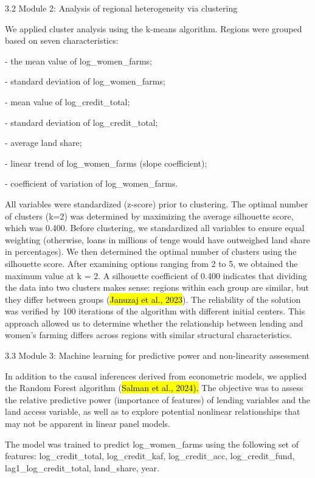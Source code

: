 3.2 Module 2: Analysis of regional heterogeneity via clustering

We applied cluster analysis using the k-means algorithm. Regions were
grouped based on seven characteristics:

- the mean value of log\_women\_farms;

- standard deviation of log\_women\_farms;

- mean value of log\_credit\_total;

- standard deviation of log\_credit\_total;

- average land share;

- linear trend of log\_women\_farms (slope coefficient);

- coefficient of variation of log\_women\_farms.

All variables were standardized (z-score) prior to clustering. The
optimal number of clusters (k=2) was determined by maximizing the
average silhouette score, which was 0.400. Before clustering, we
standardized all variables to ensure equal weighting (otherwise, loans
in millions of tenge would have outweighed land share in percentages).
We then determined the optimal number of clusters using the silhouette
score. After examining options ranging from 2 to 5, we obtained the
maximum value at k = 2. A silhouette coefficient of 0.400 indicates that
dividing the data into two clusters makes sense: regions within each
group are similar, but they differ between groups (\hl{Januzaj et al.,
2023}). The reliability of the solution was verified by 100 iterations
of the algorithm with different initial centers. This approach allowed
us to determine whether the relationship between lending and women's
farming differs across regions with similar structural characteristics.

3.3 Module 3: Machine learning for predictive power and non-linearity
assessment

In addition to the causal inferences derived from econometric models, we
applied the Random Forest algorithm (\hl{Salman et al., 2024).} The
objective was to assess the relative predictive power (importance of
features) of lending variables and the land access variable, as well as
to explore potential nonlinear relationships that may not be apparent in
linear panel models.

The model was trained to predict log\_women\_farms using the following
set of features: log\_credit\_total, log\_credit\_kaf, log\_credit\_acc,
log\_credit\_fund, lag1\_log\_credit\_total, land\_share, year.

